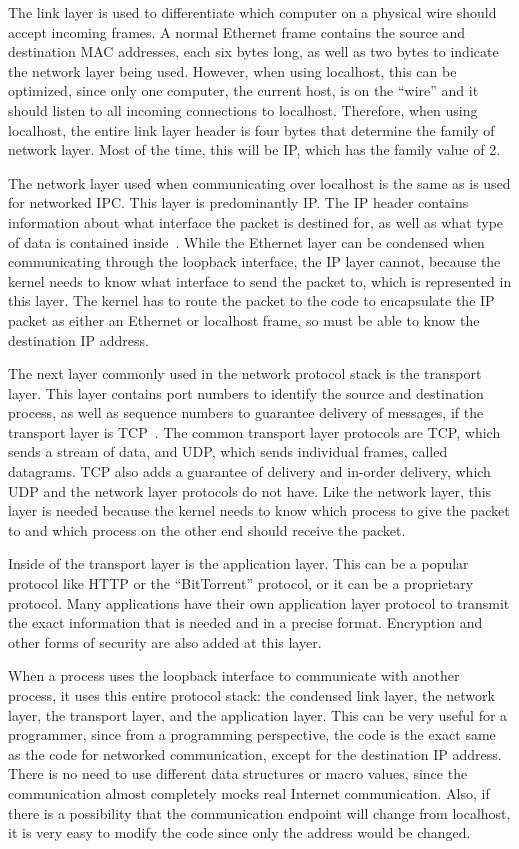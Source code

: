 The link layer is used to differentiate which computer on a physical wire should accept incoming frames.  A normal Ethernet frame contains the source and destination MAC addresses, each six bytes long, as well as two bytes to indicate the network layer being used.  However, when using localhost, this can be optimized, since only one computer, the current host, is on the ``wire'' and it should listen to all incoming connections to localhost.  Therefore, when using localhost, the entire link layer header is four bytes that determine the family of network layer.  Most of the time, this will be IP, which has the family value of 2.

The network layer used when communicating over localhost is the same as is used for networked IPC.  This layer is predominantly IP.  The IP header contains information about what interface the packet is destined for, as well as what type of data is contained inside~\cite{RFC0791}.  While the Ethernet layer can be condensed when communicating through the loopback interface, the IP layer cannot, because the kernel needs to know what interface to send the packet to, which is represented in this layer.  The kernel has to route the packet to the code to encapsulate the IP packet as either an Ethernet or localhost frame, so must be able to know the destination IP address.

The next layer commonly used in the network protocol stack is the transport layer.  This layer contains port numbers to identify the source and destination process, as well as sequence numbers to guarantee delivery of messages, if the transport layer is TCP~\cite{RFC0793}.  The common transport layer protocols are TCP, which sends a stream of data, and UDP, which sends individual frames, called datagrams.  TCP also adds a guarantee of delivery and in-order delivery, which UDP and the network layer protocols do not have.  Like the network layer, this layer is needed because the kernel needs to know which process to give the packet to and which process on the other end should receive the packet.

Inside of the transport layer is the application layer.  This can be a popular protocol like HTTP or the ``BitTorrent'' protocol, or it can be a proprietary protocol.  Many applications have their own application layer protocol to transmit the exact information that is needed and in a precise format.  Encryption and other forms of security are also added at this layer.

When a process uses the loopback interface to communicate with another process, it uses this entire protocol stack: the condensed link layer, the network layer, the transport layer, and the application layer.  This can be very useful for a programmer, since from a programming perspective, the code is the exact same as the code for networked communication, except for the destination IP address.  There is no need to use different data structures or macro values, since the communication almost completely mocks real Internet communication.  Also, if there is a possibility that the communication endpoint will change from localhost, it is very easy to modify the code since only the address would be changed.

